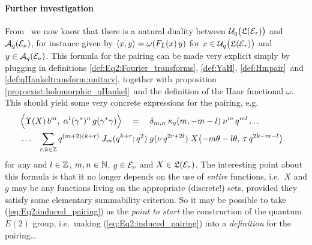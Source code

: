 \paragraph{Further investigation}
From \cite[lemmas 2.3.1 and 2.6.1]{Jeroen:QE2:haar}\ we now know that
there is a natural duality between
$\Uq\!\left(\calL(\Hcore_\tau)\vertM\right)$ and ${\mathcal A}_q(\mathcal E_\nu)$,
for instance given by $\langle x,y \rangle = \omega(F_L(x)\,y) $
for $x \in \Uq\!\left(\calL(\Hcore_\tau)\vertM\right)$ and $y \in {\mathcal A}_q(\mathcal E_\nu)$.
This formula for the pairing can be made very explicit simply by
plugging in definitions \ref{def:Eq2:Fourier_transforms},
\ref{def:YaH}, \ref{def:Hmpair}\ and \ref{def:qHankeltransform:unitary},
together with proposition \ref{prop:exist:holomorphic_qHankel}\
and the definition of the Haar functional $\omega$.
This should yield some very concrete expressions for the pairing, e.g.
\begin{eqnarray}
  \lefteqn{  \left\langle \vertL\Upsilon(X)\, b^m, \;
     \alpha^l (\gamma^*)^n \,g(\gamma^*\gamma)  \right\rangle
     \hspace{1em}=\hspace{1em}
     \delta_{m,n} \: \kq(m,-m-l)\: \nu^m \, q^{ml} \ldots } \\
  &\ldots & \sum_{r,k\in \ZZ}   q^{(m+2)(k+r)} \: \J{m}{q^{k+r}} \;   g(\nu\, q^{2r+2l}) \;
       X\!\left(-m\theta-l\theta, \: \tau\, q^{2k-m-l} \vertM
           \right) \hspace{1em} \label{eq:Eq2:induced_pairing}
\end{eqnarray}
for any and $l\in \mathbb{Z}$, $m,n\in \mathbb{N}$, $g \in \mathcal E_\nu$ and $X\in \mathfrak{L}(\mathcal E_\tau)$.
The interesting point about this formula is that it no longer
depends on the use of {\em entire\/} functions, i.e.\ $X$ and $g$
may be any functions living on the appropriate (discrete!) sets,
provided they satisfy some elementary summability criterion.
So it may be possible to take (\ref{eq:Eq2:induced_pairing}) as the
{\em point to start\/} the construction of the quantum $E(2)$
group, i.e.\ making (\ref{eq:Eq2:induced_pairing}) into a {\em definition\/}
for the pairing\ldots





